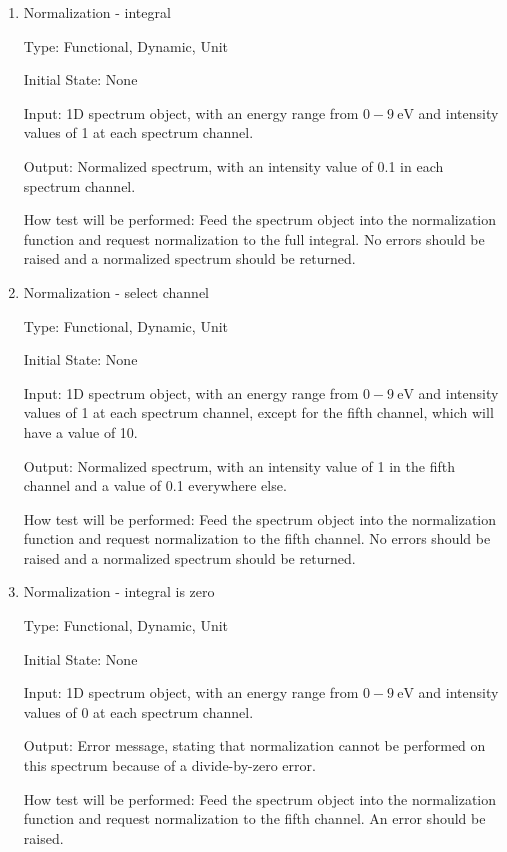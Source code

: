 \documentclass[12pt, titlepage]{article}
\begin{document}
\begin{enumerate}

\item{Normalization - integral}

Type: Functional, Dynamic, Unit

Initial State: None

Input: 1D spectrum object, with an energy range from $0-9\ \si{\electronvolt}$
and intensity values of 1 at each spectrum channel.

Output: Normalized spectrum, with an intensity value of 0.1 in each spectrum
channel.

How test will be performed: Feed the spectrum object into the normalization
function and request normalization to the full integral. No errors should be
raised and a normalized spectrum should be returned.


\item{Normalization - select channel}

Type: Functional, Dynamic, Unit

Initial State: None

Input: 1D spectrum object, with an energy range from $0-9\ \si{\electronvolt}$
and intensity values of 1 at each spectrum channel, except for the fifth
channel, which will have a value of 10. 

Output: Normalized spectrum, with an intensity value of 1 in the fifth channel
and a value of 0.1 everywhere else.

How test will be performed: Feed the spectrum object into the normalization
function and request normalization to the fifth channel. No errors should be
raised and a normalized spectrum should be returned.


\item{Normalization - integral is zero}

Type: Functional, Dynamic, Unit

Initial State: None

Input: 1D spectrum object, with an energy range from $0-9\ \si{\electronvolt}$
and intensity values of 0 at each spectrum channel. 

Output: Error message, stating that normalization cannot be performed on this
spectrum because of a divide-by-zero error.

How test will be performed: Feed the spectrum object into the normalization
function and request normalization to the fifth channel. An error should be
raised.

\end{enumerate}
\end{document}
